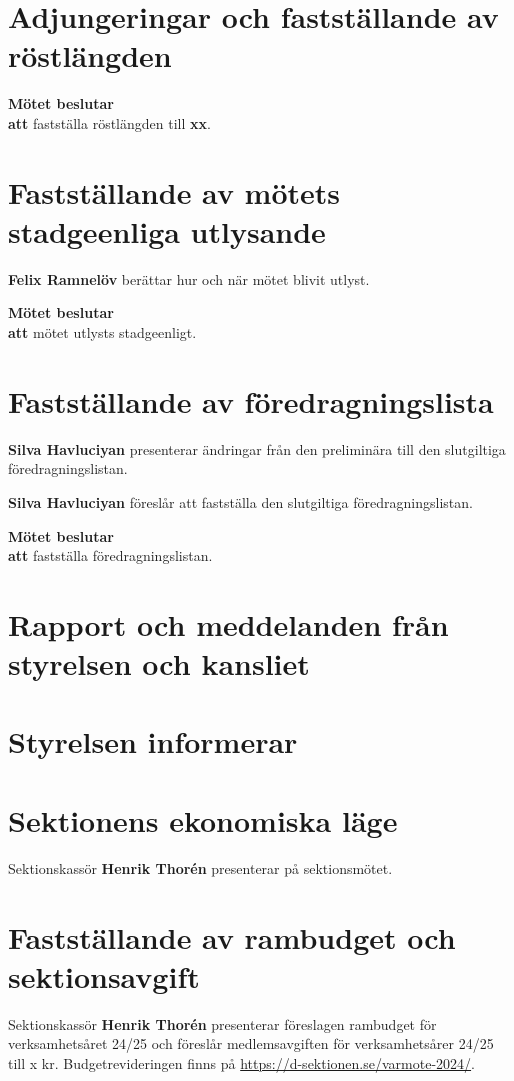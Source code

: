 \documentclass{datateknologsektionen-document}
\newcommand{\ind}{\hspace*{2em}}
\newcommand{\motetbeslutar}{\textbf{Mötet beslutar}}
\newcommand{\att}{\\\ind\textbf{att}}
\newcommand{\rostlangd}[1]{\motetbeslutar\att{} fastställa röstlängden till \textbf{#1}.}
\begin{document}
\section{Adjungeringar och fastställande av röstlängden}



\rostlangd{xx}



\section{Fastställande av mötets stadgeenliga utlysande}
\textbf{Felix Ramnelöv} berättar hur och när mötet blivit utlyst.

\motetbeslutar\att{} mötet utlysts stadgeenligt.



\section{Fastställande av föredragningslista}
\textbf{Silva Havluciyan} presenterar ändringar från den preliminära till den slutgiltiga föredragningslistan.

\textbf{Silva Havluciyan} föreslår att fastställa den slutgiltiga föredragningslistan.

\motetbeslutar\att{} fastställa föredragningslistan.
\pagebreak


\section{Rapport och meddelanden från styrelsen och kansliet}



\section{Styrelsen informerar}


\section{Sektionens ekonomiska läge}
Sektionskassör \textbf{Henrik Thorén} presenterar på sektionsmötet.



\section{Fastställande av rambudget och sektionsavgift}
Sektionskassör \textbf{Henrik Thorén} presenterar föreslagen rambudget för verksamhetsåret 24/25 och föreslår medlemsavgiften för verksamhetsårer 24/25 till x kr. Budgetrevideringen finns på \url{https://d-sektionen.se/varmote-2024/}.
\end{document}
